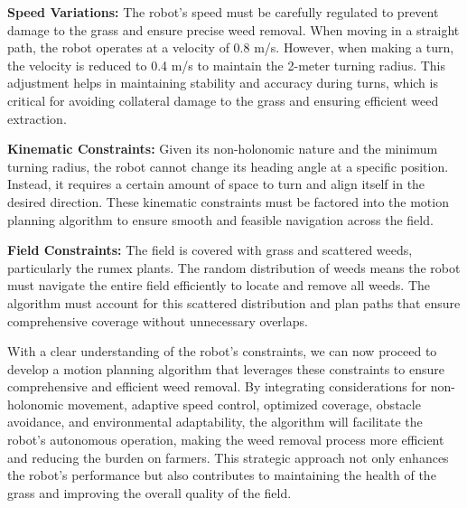 \vspace*{6mm}

\textbf{Speed Variations:} The robot's speed must be carefully regulated to prevent damage to the grass and ensure precise weed removal. When moving in a straight path, the robot operates at a velocity of 0.8 m/s. However, when making a turn, the velocity is reduced to 0.4 m/s to maintain the 2-meter turning radius. This adjustment helps in maintaining stability and accuracy during turns, which is critical for avoiding collateral damage to the grass and ensuring efficient weed extraction.

\vspace*{6mm}

\textbf{Kinematic Constraints:} Given its non-holonomic nature and the minimum turning radius, the robot cannot change its heading angle at a specific position. Instead, it requires a certain amount of space to turn and align itself in the desired direction. These kinematic constraints must be factored into the motion planning algorithm to ensure smooth and feasible navigation across the field.

\vspace*{6mm}

\textbf{Field Constraints:} The field is covered with grass and scattered weeds, particularly the rumex plants. The random distribution of weeds means the robot must navigate the entire field efficiently to locate and remove all weeds. The algorithm must account for this scattered distribution and plan paths that ensure comprehensive coverage without unnecessary overlaps.


\vspace*{6mm}



With a clear understanding of the robot's constraints, we can now proceed to develop a motion planning algorithm that leverages these constraints to ensure comprehensive and efficient weed removal. By integrating considerations for non-holonomic movement, adaptive speed control, optimized coverage, obstacle avoidance, and environmental adaptability, the algorithm will facilitate the robot's autonomous operation, making the weed removal process more efficient and reducing the burden on farmers. This strategic approach not only enhances the robot's performance but also contributes to maintaining the health of the grass and improving the overall quality of the field.

























